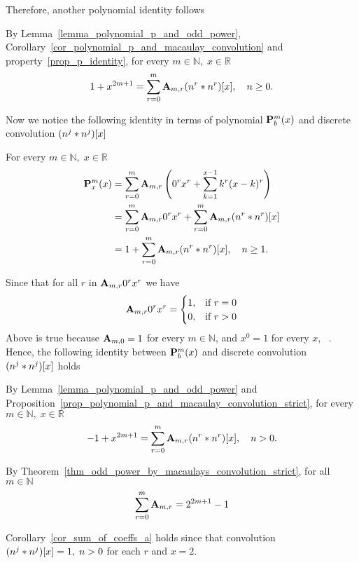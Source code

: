 Therefore, another polynomial identity follows
\begin{thm}
    \label{thm_odd_power_by_macaulays_convolution}
    By Lemma~\ref{lemma_polynomial_p_and_odd_power}, Corollary~\ref{cor_polynomial_p_and_macaulay_convolution}
    and property~\ref{prop_p_identity}, for every $m\in\mathbb{N}, \; x\in\mathbb{R}$
    \begin{equation*}
        1 + x^{2m+1} = \sum_{r=0}^{m} {\mathbf{A}} \sb{m,r} (n \sp{r} \ast n \sp{r}) [x], \quad n\geq 0.
    \end{equation*}
\end{thm}
Now we notice the following identity in terms of polynomial ${\mathbf{P}}\sp{m} \sb{b}(x)$ and
discrete convolution $(n \sp{j} \ast n \sp{j}) [x]$
\begin{prop}
    \label{prop_polynomial_p_and_macaulay_convolution_strict}
    For every $m \in \mathbb{N}, \; x\in\mathbb{R}$
    \begin{equation*}
        \begin{split}
            {\mathbf{P}}\sp{m} \sb{x}(x)
            &=\sum_{r=0}^{m} {\mathbf{A}} \sb{m,r} \left(0^r x^r + \sum_{k=1}^{x-1} k^r (x-k)^r \right) \\
            &=\sum_{r=0}^{m} {\mathbf{A}} \sb{m,r} 0^r x^r + \sum_{r=0}^{m} {\mathbf{A}} \sb{m,r} (n \sp{r} \ast n \sp{r}) [x] \\
            &=1 + \sum_{r=0}^{m} {\mathbf{A}} \sb{m,r} (n \sp{r} \ast n \sp{r}) [x], \quad n\geq 1.
        \end{split}
    \end{equation*}
\end{prop}
Since that for all $r$ in ${\mathbf{A}} \sb{m,r} 0^r x^r$ we have
\begin{equation*}
    {\mathbf{A}} \sb{m,r} 0^r x^r =
    \begin{cases}
        1, & \mbox{if } r=0 \\
        0, & \mbox{if } r>0
    \end{cases}
\end{equation*}
Above is true because ${\mathbf{A}} \sb{m,0}=1$ for every $m\in\mathbb{N}$, and $x^0 = 1$
for every $x$, ~\cite{Grah94SN}.
Hence, the following identity between ${\mathbf{P}}\sp{m} \sb{b}(x)$ and
discrete convolution $(n \sp{j} \ast n \sp{j}) [x]$ holds
\begin{thm}
    \label{thm_odd_power_by_macaulays_convolution_strict}
    By Lemma~\ref{lemma_polynomial_p_and_odd_power} and
    Proposition~\ref{prop_polynomial_p_and_macaulay_convolution_strict},
    for every $m\in\mathbb{N}, \; x\in\mathbb{R}$
    \begin{equation*}
        -1 + x^{2m+1} = \sum_{r=0}^{m} {\mathbf{A}} \sb{m,r} (n \sp{r} \ast n \sp{r}) [x], \quad n > 0.
    \end{equation*}
\end{thm}
\begin{cor}
    \label{cor_sum_of_coeffs_a}
    By Theorem~\ref{thm_odd_power_by_macaulays_convolution_strict}, for all $m\in\mathbb{N}$
    \begin{equation*}
        \sum_{r=0}^{m} {\mathbf{A}} \sb{m,r} = 2^{2m+1} - 1
    \end{equation*}
\end{cor}
Corollary~\ref{cor_sum_of_coeffs_a} holds since that convolution $(n \sp{j} \ast n \sp{j}) [x]=1, \; n > 0$
for each $r$ and $x=2$.
